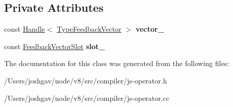 \subsection*{Private Attributes}
\begin{DoxyCompactItemize}
\item 
const \hyperlink{classv8_1_1internal_1_1_handle}{Handle}$<$ \hyperlink{classv8_1_1internal_1_1_type_feedback_vector}{Type\+Feedback\+Vector} $>$ {\bfseries vector\+\_\+}\hypertarget{classv8_1_1internal_1_1compiler_1_1_vector_slot_pair_a57bcdfa184f3daa323c3e2d5f0c8b8e7}{}\label{classv8_1_1internal_1_1compiler_1_1_vector_slot_pair_a57bcdfa184f3daa323c3e2d5f0c8b8e7}

\item 
const \hyperlink{classv8_1_1internal_1_1_feedback_vector_slot}{Feedback\+Vector\+Slot} {\bfseries slot\+\_\+}\hypertarget{classv8_1_1internal_1_1compiler_1_1_vector_slot_pair_a5291b6a539a35fa1553665a28d4395a2}{}\label{classv8_1_1internal_1_1compiler_1_1_vector_slot_pair_a5291b6a539a35fa1553665a28d4395a2}

\end{DoxyCompactItemize}


The documentation for this class was generated from the following files\+:\begin{DoxyCompactItemize}
\item 
/\+Users/joshgav/node/v8/src/compiler/js-\/operator.\+h\item 
/\+Users/joshgav/node/v8/src/compiler/js-\/operator.\+cc\end{DoxyCompactItemize}
